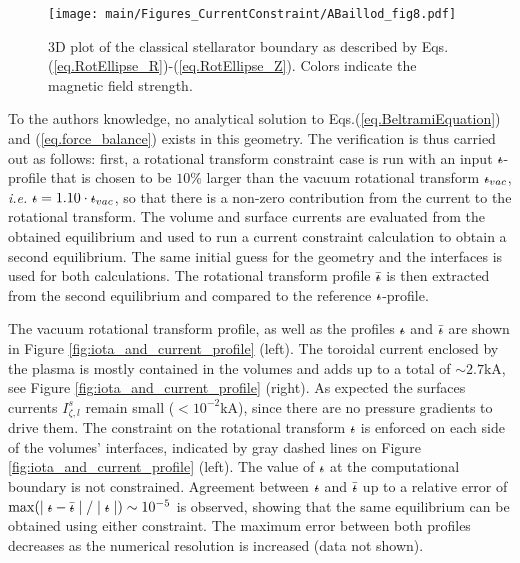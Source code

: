 \documentclass[my_thesis.tex]{subfiles}
\begin{document}
\begin{figure}
	\centering
	\texttt{[image: main/Figures\_CurrentConstraint/ABaillod\_fig8.pdf]}
	\caption{\ac{3D} plot of the classical stellarator boundary as described by Eqs.(\ref{eq.RotEllipse_R})-(\ref{eq.RotEllipse_Z}). Colors indicate the magnetic field strength.}
	\label{fig:3Dplot}
\end{figure}

To the authors knowledge, no analytical solution to Eqs.(\ref{eq.BeltramiEquation}) and (\ref{eq.force_balance}) exists in this geometry. The verification is thus carried out as follows: first, a rotational transform constraint case is run with an input $\text{$\iota\!\!$-}$-profile that is chosen to be $10\%$ larger than the vacuum rotational transform $\text{$\iota\!\!$-}_{vac}$, \textit{i.e.} $\text{$\iota\!\!$-} = 1.10\cdot\text{$\iota\!\!$-}_{vac}$, so that there is a non-zero contribution from the current to the rotational transform. The volume and surface currents are evaluated from the obtained equilibrium and used to run a current constraint calculation to obtain a second equilibrium. The same initial guess for the geometry and the interfaces is used for both calculations. The rotational transform profile $\bar{\text{$\iota\!\!$-}}$ is then extracted from the second equilibrium and compared to the reference $\text{$\iota\!\!$-}$-profile.

The vacuum rotational transform profile, as well as the profiles $\text{$\iota\!\!$-}$ and $\bar{\text{$\iota\!\!$-}}$ are shown in Figure \ref{fig:iota_and_current_profile} (left). The toroidal current enclosed by the plasma is mostly contained in the volumes and adds up to a total of $\sim 2.7$kA, see Figure \ref{fig:iota_and_current_profile} (right). As expected the surfaces currents $I^s_{\zeta,l}$ remain small ($<10^{-2}$kA), since there are no pressure gradients to drive them. The constraint on the rotational transform $\text{$\iota\!\!$-}$ is enforced on each side of the volumes' interfaces, indicated by gray dashed lines on Figure \ref{fig:iota_and_current_profile} (left). The value of $\text{$\iota\!\!$-}$ at the computational boundary is not constrained. Agreement between $\text{$\iota\!\!$-}$ and $\bar{\text{$\iota\!\!$-}}$ up to a relative error of $\max(\mid\text{$\iota\!\!$-}-\bar{\text{$\iota\!\!$-}}\mid / \mid\text{$\iota\!\!$-}\mid)\sim 10^{-5}$ is observed, showing that the same equilibrium can be obtained using either constraint. The maximum error between both profiles decreases as the numerical resolution is increased (data not shown).
\end{document}

